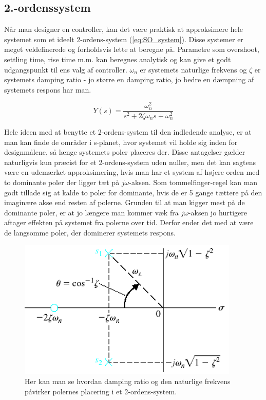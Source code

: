 \subsection{2.-ordenssystem}

Når man designer en controller, kan det være praktisk at approksimere hele systemet som et ideelt 2-ordens-system (\ref{eq:SO_system}). Disse systemer er meget veldefinerede og forholdsvis lette at beregne på. Parametre som overshoot, settling time, rise time m.m. kan beregnes analytisk og kan give et godt udgangspunkt til ens valg af controller. $\omega_{n}$ er systemets naturlige frekvens og $\zeta$ er systemets damping ratio - jo større en damping ratio, jo bedre en dæmpning af systemets respons har man.

\begin{equation}\label{eq:SO_system}
Y(s)=\frac{\omega_{n}^2}{s^2+2\zeta\omega_{n}s+\omega_{n}^2}
\end{equation}

Hele ideen med at benytte et 2-ordens-system til den indledende analyse, er at man kan finde de områder i s-planet, hvor systemet vil holde sig inden for designmålene, så længe systemets poler placeres der. Disse antagelser gælder naturligvis kun præcist for et 2-ordens-system uden nuller, men det kan sagtens være en udemærket approksimering, hvis man har et system af højere orden med to dominante poler der ligger tæt på $j\omega$-aksen. Som tommelfinger-regel kan man godt tillade sig at kalde to poler for dominante, hvis de er 5 gange tættere på den imaginære akse end resten af polerne. Grunden til at man kigger mest på de dominante poler, er at jo længere man kommer væk fra $j\omega$-aksen jo hurtigere aftager effekten på systemet fra polerne over tid. Derfor ender det med at være de langsomme poler, der dominerer systemets respons.

\begin{figure}	
	\includegraphics[scale=0.5]{Billeder/Damping_Ratio.PNG}
	\centering
	\caption{Her kan man se hvordan damping ratio og den naturlige frekvens påvirker polernes placering i et 2-ordens-system.}
	\label{fig:SO_system}
\end{figure}
\lipsum[12]

